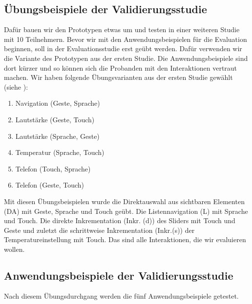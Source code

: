 \subsection[Übungsbeispiele]{Übungsbeispiele der Validierungsstudie}
Dafür bauen wir den Prototypen etwas um und testen in einer weiteren Studie mit 10 Teilnehmern. Bevor wir mit den Anwendungsbeispielen für die Evaluation beginnen, soll in der Evaluationsstudie erst geübt werden. Dafür verwenden wir die Variante des Prototypen aus der ersten Studie. Die Anwendungsbeispiele sind dort  kürzer und so können sich die Probanden mit den Interaktionen vertraut machen.
Wir haben folgende Übungsvarianten aus der ersten Studie gewählt (siehe ):
\begin{enumerate}
	\item Navigation (Geste, Sprache)
	\item Lautstärke (Geste, Touch)
	\item Lautstärke (Sprache, Geste)
	\item Temperatur (Sprache, Touch)
	\item Telefon (Touch, Sprache)
	\item Telefon (Geste, Touch)
\end{enumerate}
Mit diesen Übungsbeispielen wurde die Direktauswahl aus sichtbaren Elementen (DA) mit Geste, Sprache und Touch geübt. Die Listennavigation (L) mit Sprache und Touch. Die direkte Inkrementation (Inkr. (d)) des Sliders mit Touch und Geste und zuletzt die schrittweise Inkrementation (Inkr.(s)) der Temperatureinstellung mit Touch. Das sind alle Interaktionen, die wir evaluieren wollen.
\subsection[Anwendungsbeispiele]{Anwendungsbeispiele der Validierungsstudie}
Nach diesem Übungsdurchgang werden die fünf Anwendungsbeispiele getestet. 
 
